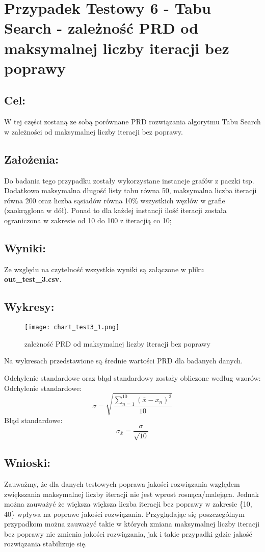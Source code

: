 \section{Przypadek Testowy 6 - Tabu Search - zależność PRD od maksymalnej liczby iteracji bez poprawy}
  \subsection{Cel:}
    W tej części zostaną ze sobą porównane PRD rozwiązania algorytmu Tabu Search w zależności od maksymalnej liczby iteracji bez poprawy.
    \subsection{Założenia:}
    Do badania tego przypadku zostały wykorzystane instancje grafów z paczki tsp. Dodatkowo maksymalna długość listy tabu równa 50, maksymalna liczba iteracji równa 200 oraz liczba sąsiadów równa 10\% wszystkich węzłów w grafie (zaokrąglona w dół). Ponad to dla każdej instancji ilość iteracji została ograniczona w zakresie od 10 do 100 z iteracjią co 10;
  \subsection{Wyniki: }
    Ze względu na czytelność wszystkie wyniki są załączone w pliku \textbf{out_test_3.csv}.
  \subsection{Wykresy: }
    \begin{figure}[H]
      \texttt{[image: chart\_test3\_1.png]}
      \centering
      \caption{zależność PRD od maksymalnej liczby iteracji bez poprawy}
    \end{figure}
    
    Na wykresach przedstawione są średnie wartości PRD dla badanych danych.

    Odchylenie standardowe oraz błąd standardowy zostały obliczone według wzorów: \\
    Odchylenie standardowe:
    \[ \sigma = \sqrt{\frac{\sum_{n = 1}^{10}(\bar{x} - x_n)^2}{10}} \]
    Błąd standardowe:
    \[ \sigma_{\bar{x}} = \frac{\sigma}{\sqrt{10}} \]

  \subsection{Wnioski: }
    Zauważmy, że dla danych testowych poprawa jakości rozwiązania względem zwiększania maksymalnej liczby iteracji nie jest wprost rosnąca/malejąca. Jednak można zauważyć że większa większa liczba iteracji bez poprawy w zakresie \{10, 40\} wpływa na poprawe jakości rozwiązania. Przyglądając się poszczególnym przypadkom można zauważyć takie w których zmiana maksymalnej liczby iteracji bez poprawy nie zmienia jakości rozwiązania, jak i takie przypadki gdzie jakość rozwiązania stabilizuje się.

